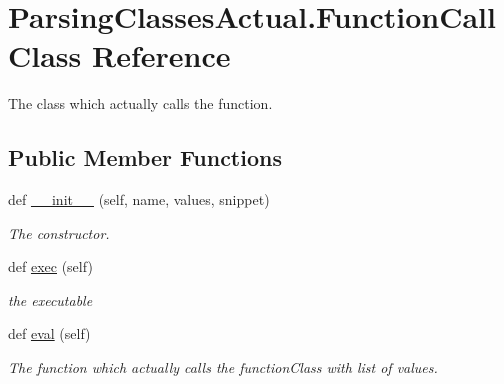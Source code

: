 \hypertarget{class_parsing_classes_actual_1_1_function_call}{}\section{Parsing\+Classes\+Actual.\+Function\+Call Class Reference}
\label{class_parsing_classes_actual_1_1_function_call}


The class which actually calls the function.  


\subsection*{Public Member Functions}
\begin{DoxyCompactItemize}
\item 
def \hyperlink{class_parsing_classes_actual_1_1_function_call_a8129d2bc94019485d3e27f67f825a7c1}{\+\_\+\+\_\+init\+\_\+\+\_\+} (self, name, values, snippet)
\begin{DoxyCompactList}\small\item\em The constructor. \end{DoxyCompactList}\item 
\mbox{\label{class_parsing_classes_actual_1_1_function_call_a936742ba81a65d527febba924bd8aac2}} 
def \hyperlink{class_parsing_classes_actual_1_1_function_call_a936742ba81a65d527febba924bd8aac2}{exec} (self)
\begin{DoxyCompactList}\small\item\em the executable \end{DoxyCompactList}\item 
\mbox{\label{class_parsing_classes_actual_1_1_function_call_a3f61827e167eb1869eb2edc824cbbe1b}} 
def \hyperlink{class_parsing_classes_actual_1_1_function_call_a3f61827e167eb1869eb2edc824cbbe1b}{eval} (self)
\begin{DoxyCompactList}\small\item\em The function which actually calls the function\+Class with list of values. \end{DoxyCompactList}\end{DoxyCompactItemize}
